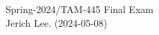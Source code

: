 \documentclass[12pt]{article}
\begin{document}
\noindent Spring-2024/TAM-445 \hfill Final Exam\\
Jerich Lee. (2024-05-08)

\hrulefill






\end{document}
